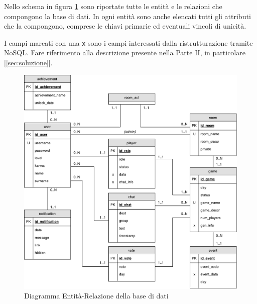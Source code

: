 Nello schema in figura \ref{fig:er} sono riportate tutte le entità e le relazioni che compongono la base di dati. In ogni entità sono anche elencati tutti gli attributi che la compongono, comprese le chiavi primarie ed eventuali vincoli di unicità.

I campi marcati con una \texttt{x} sono i campi interessati dalla ristrutturazione tramite NoSQL. Fare riferimento alla descrizione presente nella Parte II, in particolare [\ref{sec:soluzione}].

\newpage

\begin{figure}[H]
	\centering
	\includegraphics[width=\textwidth]{ER.pdf}
	\caption{Diagramma Entità-Relazione della base di dati}
	\label{fig:er}
\end{figure}


